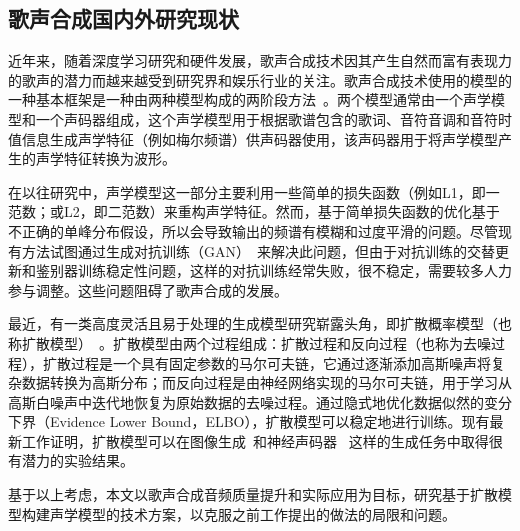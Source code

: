 \subsection{歌声合成国内外研究现状}
近年来，随着深度学习研究和硬件发展，歌声合成技术因其产生自然而富有表现力的歌声的潜力而越来越受到研究界和娱乐行业的关注。歌声合成技术使用的模型的一种基本框架是一种由两种模型构成的两阶段方法~\citep{nakamura2019singing,lee2019adversarially,blaauw2020sequence,ren2020deepsinger,chen2020hifisinger}。两个模型通常由一个声学模型和一个声码器组成，这个声学模型用于根据歌谱包含的歌词、音符音调和音符时值信息生成声学特征（例如梅尔频谱）供声码器使用，该声码器用于将声学模型产生的声学特征转换为波形。

在以往研究中，声学模型这一部分主要利用一些简单的损失函数（例如L1，即一范数；或L2，即二范数）来重构声学特征。然而，基于简单损失函数的优化基于不正确的单峰分布假设，所以会导致输出的频谱有模糊和过度平滑的问题。尽管现有方法试图通过生成对抗训练（GAN）~\citep{lee2019adversarially,chen2020hifisinger}来解决此问题，但由于对抗训练的交替更新和鉴别器训练稳定性问题，这样的对抗训练经常失败，很不稳定，需要较多人力参与调整。这些问题阻碍了歌声合成的发展。

最近，有一类高度灵活且易于处理的生成模型研究崭露头角，即扩散概率模型（也称扩散模型）~\citep{sohl2015deep,Ho2020ddpm,song2021denoising}。扩散模型由两个过程组成：扩散过程和反向过程（也称为去噪过程），扩散过程是一个具有固定参数的马尔可夫链，它通过逐渐添加高斯噪声将复杂数据转换为高斯分布；而反向过程是由神经网络实现的马尔可夫链，用于学习从高斯白噪声中迭代地恢复为原始数据的去噪过程。通过隐式地优化数据似然的变分下界（Evidence Lower Bound，ELBO），扩散模型可以稳定地进行训练。现有最新工作证明，扩散模型可以在图像生成~\citep{Ho2020ddpm,song2021denoising}和神经声码器~
\citep{chen2021wavegrad,kong2021diffwave}这样的生成任务中取得很有潜力的实验结果。

基于以上考虑，本文以歌声合成音频质量提升和实际应用为目标，研究基于扩散模型构建声学模型的技术方案，以克服之前工作提出的做法的局限和问题。
